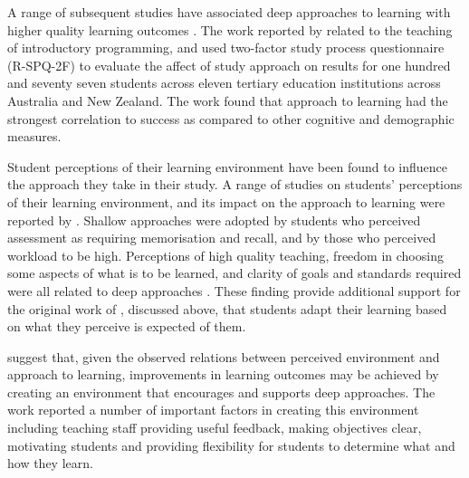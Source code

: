 A range of subsequent studies have associated deep approaches to learning with higher quality learning outcomes \cite{Rossum:1984,Prosser:1989,Trigwell:1991,Ramsden:1992,Marton:2005,DeRaadt:2005}. The work reported by \citet{DeRaadt:2005} related to the teaching of introductory programming, and used \cite{Biggs:2001} two-factor study process questionnaire (R-SPQ-2F) to evaluate the affect of study approach on results for one hundred and seventy seven students across eleven tertiary education institutions across Australia and New Zealand. The work found that approach to learning  had the strongest correlation to success as compared to other cognitive and demographic measures.

Student perceptions of their learning environment have been found to influence the approach they take in their study. A range of studies on students' perceptions of their learning environment, and its impact on the approach to learning were reported by \citet{Ramsden:1992}. Shallow approaches were adopted by students who perceived assessment as requiring memorisation and recall, and by those who perceived workload to be high. Perceptions of high quality teaching, freedom in choosing some aspects of what is to be learned, and clarity of goals and standards required were all related to deep approaches \cite{Trigwell:1991,Ramsden:1992,Trigwell:1999}. These finding provide additional support for the original work of \cite{Marton:1976b}, discussed above, that students adapt their learning based on what they perceive is expected of them.

\citet{Trigwell:1999} suggest that, given the observed relations between perceived environment and approach to learning, improvements in learning outcomes may be achieved by creating an environment that encourages and supports deep approaches.  The work reported a number of important factors in creating this environment including teaching staff providing useful feedback, making objectives clear, motivating students and providing flexibility for students to determine what and how they learn. 

